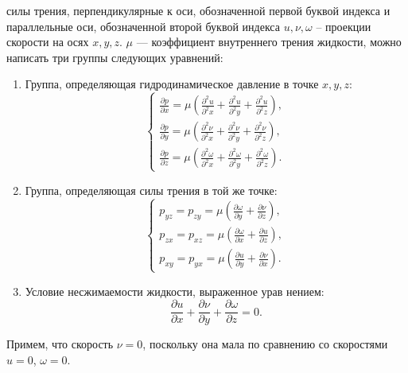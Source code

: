 \documentclass[12pt, a4paper]{article}
\begin{document}
силы трения, перпендикулярные к оси, обозначенной первой буквой индекса и параллельные оси, обозначенной второй буквой индекса $u, \nu, \omega$ -- проекции скорости на осях $x, y, z \text{. }$$\mu$ --- коэффициент внутреннего трения жидкости, можно написать три группы следующих уравнений:
\begin{enumerate}
	\item Группа, определяющая гидродинамическое давление в
	точке $x, y, z$:
	\begin{equation}
		\label{eqfi}
		\begin{cases}
			\frac{\partial p}{\partial x} = \mu \left( \frac{\partial^2 u}{\partial^2 x} + \frac{\partial^2 u}{\partial^2 y} + \frac{\partial^2 u}{\partial^2 z} \right), \\
				\frac{\partial p}{\partial y} = \mu \left( \frac{\partial^2 \nu}{\partial^2 x} + \frac{\partial^2 \nu}{\partial^2 y} + \frac{\partial^2 \nu}{\partial^2 z} \right), \\
					\frac{\partial p}{\partial z} = \mu \left( \frac{\partial^2 \omega}{\partial^2 x} + \frac{\partial^2 \omega}{\partial^2 y} + \frac{\partial^2 \omega}{\partial^2 z} \right).
		\end{cases}
	\end{equation}
\item Группа, определяющая силы трения в той же точке:
\begin{equation}
	\label{eqsi}
	\begin{cases}
		p_{yz} = p_{zy} = \mu \left(\frac{\partial \omega}{\partial y} + \frac{\partial \nu}{\partial z} \right), \\
			p_{zx} = p_{xz} = \mu \left( \frac{\partial \omega}{\partial x} +  \frac{\partial u}{\partial z} \right), \\
				p_{xy} = p_{yx} = \mu \left(  \frac{\partial u}{\partial y} + \frac{\partial \nu}{\partial x} \right).
	\end{cases}
\end{equation}
\item Условие несжимаемости жидкости, выраженное урав
нением: 
\begin{equation}
	\label{eqthi}
	\frac{\partial u}{\partial x} + \frac{\partial \nu}{\partial y} + \frac{\partial \omega}{\partial z} = 0.
	\end{equation}

\end{enumerate}

Примем, что скорость $\nu = 0$, поскольку она мала по сравнению со скоростями $u = 0$, $\omega = 0$.
\end{document}
